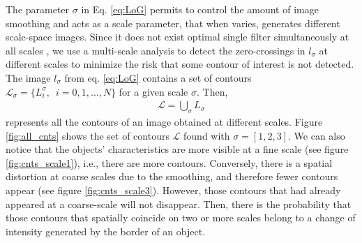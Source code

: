 The parameter $\sigma$ in Eq. \eqref{eq:LoG} permits to control the amount of image smoothing and acts as a scale parameter, that when varies, generates different scale-space images. Since it does not exist optimal single filter simultaneously at all scales \citep{Marr.Hildreth:PRS:1980}, we use a multi-scale analysis \citep{Witkin:ICASSP:1984} to detect the zero-crossings in $l_\sigma$ at different scales to minimize the risk that some contour of interest is not detected. The image $l_\sigma$ from eq. \eqref{eq:LoG} contains a set of contours $\mathcal{L}_{\sigma}=\{L_{i}^{\sigma}, \enspace i=0, 1, \ldots, N\}$ for a given scale $\sigma$. Then, 
\begin{eqnarray}\label{eq:all_ctns_set}
\mathcal{L}=\bigcup\limits_{\sigma}  L_{\sigma}
\end{eqnarray}
represents all the contours of an image obtained at different scales. Figure \ref{fig:all_cnts} shows the set of contours $\mathcal{L}$ found with $\sigma=[1,2,3]$. We can also notice that the objects' characteristics are more visible at a fine scale (see figure \ref{fig:cnts_scale1}), i.e., there are more contours. Conversely, there is a spatial distortion at coarse scales due to the smoothing, and therefore fewer contours appear (see figure \ref{fig:cnts_scale3}). However, those contours that had already appeared at a coarse-scale will not disappear. Then, there is the probability that those contours that spatially coincide on two or more scales belong to a change of intensity generated by the border of an object.

